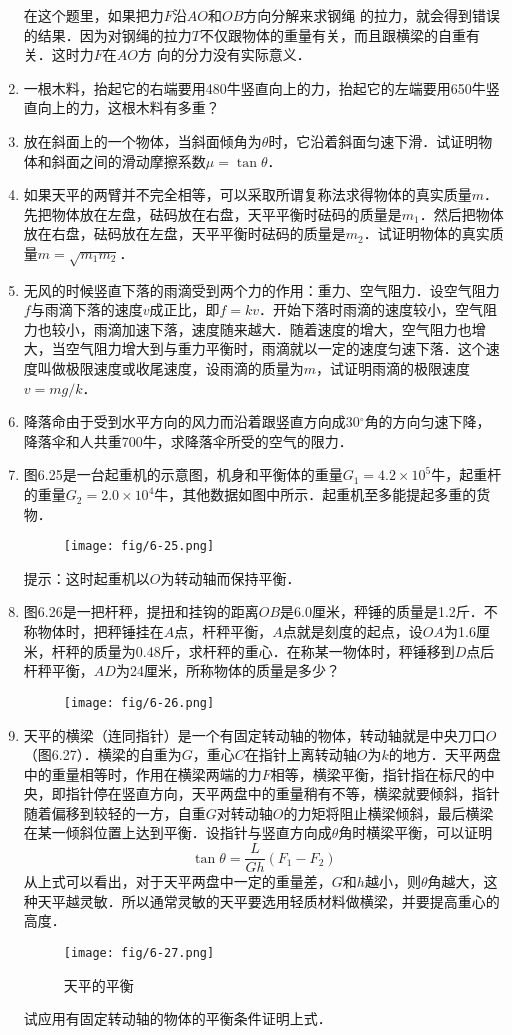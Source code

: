 \begin{enumerate}
\begin{solution}
在这个题里，如果把力$F$沿$AO$和$OB$方向分解来求钢绳
的拉力，就会得到错误的结果．因为对钢绳的拉力$T$不仅跟物体的重量有关，而且跟横梁的自重有关．这时力$F$在$AO$方
向的分力没有实际意义．
\end{solution}

\item 一根木料，抬起它的右端要用480牛竖直向上的力，抬起它的左端要用650牛竖直向上的力，这根木料有多重？
\item 放在斜面上的一个物体，当斜面倾角为$\theta$时，它沿着斜面匀速下滑．试证明物体和斜面之间的滑动摩擦系数$\mu=\tan \theta$．
\item 如果天平的两臂并不完全相等，可以采取所谓复称法求得物体的真实质量$m$．先把物体放在左盘，砝码放在右盘，天平平衡时砝码的质量是$m_1$．然后把物体放在右盘，砝码放在左盘，天平平衡时砝码的质量是$m_2$．试证明物体的真实质量$m=\sqrt{m_1m_2}$．
\item 无风的时候竖直下落的雨滴受到两个力的作用：重力、空气阻力．设空气阻力$f$与雨滴下落的速度$v$成正比，即$f=kv$．开始下落时雨滴的速度较小，空气阻力也较小，雨滴加速下落，速度随来越大．随着速度的增大，空气阻力也增大，当空气阻力增大到与重力平衡时，雨滴就以一定的速度匀速下落．这个速度叫做极限速度或收尾速度，设雨滴的质量为$m$，试证明雨滴的极限速度$v=mg/k$．
\item 降落命由于受到水平方向的风力而沿着跟竖直方向成30$^\circ$角的方向匀速下降，降落伞和人共重700牛，求降落伞所受的空气的限力．
\item 图6.25是一台起重机的示意图，机身和平衡体的重量$G_1=4.2\times 10^5$牛，起重杆的重量$G_2=2.0\times 10^4$牛，其他数据如图中所示．起重机至多能提起多重的货物．
\begin{figure}[htp]
\centering\texttt{[image: fig/6-25.png]}
\caption{}
\end{figure}
提示：这时起重机以$O$为转动轴而保持平衡．

\item  图6.26是一把杆秤，提扭和挂钩的距离$OB$是6.0厘米，秤锤的质量是1.2斤．不称物体时，把秤锤挂在$A$点，杆秤平衡，$A$点就是刻度的起点，设$OA$为1.6厘米，杆秤的质量为0.48斤，求杆秤的重心．在称某一物体时，秤锤移到$D$点后杆秤平衡，$AD$为24厘米，所称物体的质量是多少？
\begin{figure}[htp]
\centering\texttt{[image: fig/6-26.png]}
\caption{}
\end{figure}
\item 天平的横梁（连同指针）是一个有固定转动轴的物体，转动轴就是中央刀口$O$（图6.27）．横梁的自重为$G$，重心$C$在指针上离转动轴$O$为$k$的地方．天平两盘中的重量相等时，作用在横梁两端的力$F$相等，横梁平衡，指针指在标尺的中央，即指针停在竖直方向，天平两盘中的重量稍有不等，横梁就要倾斜，指针随着偏移到较轻的一方，自重$G$对转动轴$O$的力矩将阻止横梁倾斜，最后横梁在某一倾斜位置上达到平衡．设指针与竖直方向成$\theta$角时横梁平衡，可以证明
\[\tan\theta =\frac{L}{Gh}(F_1-F_2) \]
从上式可以看出，对于天平两盘中一定的重量差，$G$和$h$越小，则$\theta$角越大，这种天平越灵敏．所以通常灵敏的天平要选用轻质材料做横梁，并要提高重心的高度．
\begin{figure}[htp]
\centering\texttt{[image: fig/6-27.png]}
\caption{天平的平衡}
\end{figure}
试应用有固定转动轴的物体的平衡条件证明上式．


\end{enumerate}
